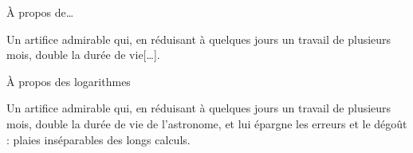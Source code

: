 \begin{frame}{À propos de\ldots}
\begin{coolquote}
Un artifice admirable qui, en réduisant à quelques jours un travail de plusieurs mois, double la durée de vie[\ldots].
\end{coolquote}
\end{frame}
\begin{frame}{À propos des logarithmes}
\begin{coolquote}
Un artifice admirable qui, en réduisant à quelques jours un travail de plusieurs mois, double la durée de vie de l'astronome, et lui épargne les erreurs et le dégoût : plaies inséparables des longs calculs.
\end{coolquote}
\end{frame}

